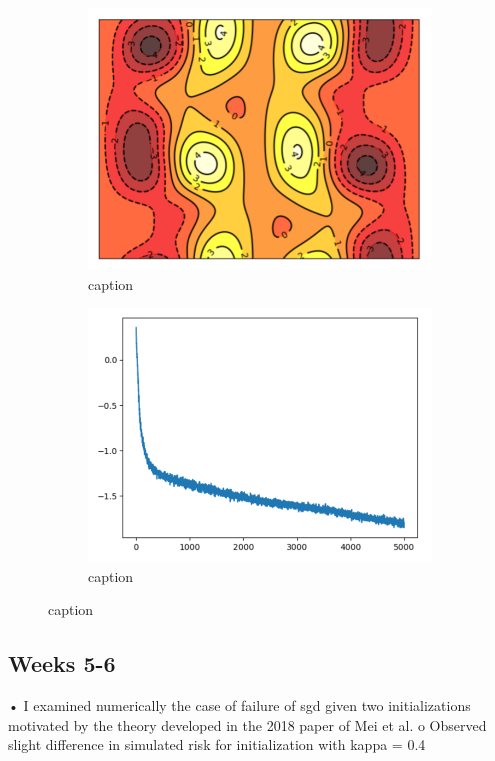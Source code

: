 \documentclass{article}
\begin{document}
\begin{figure}[H]
\begin{subfigure}{0.5\textwidth}
  \centering
  \includegraphics[width=0.8\linewidth]{images/Eijnden2018-heatmap-3dspin.png}
  \caption{ caption}
  \label{fig: description}
\end{subfigure}%
\begin{subfigure}{0.5\textwidth}
  \centering
  \includegraphics[width=0.8\linewidth]{images/Eijnden2018-loss.png}
  \caption{ caption}
  \label{fig:  description}
\end{subfigure}
\caption{ caption}
\label{fig:  label}
\end{figure}

\subsection{Weeks 5-6}
•	I examined numerically the case of failure of sgd given two initializations motivated by the theory developed in the 2018 paper of Mei et al.
o	Observed slight difference in simulated risk for initialization with kappa = 0.4
 
\end{document}
